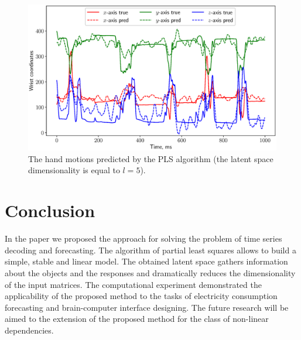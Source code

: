 \documentclass[runningheads]{llncs}
\begin{document}
\begin{figure}[!h]
	\centering
	\includegraphics[width=\textwidth]{figs/ecog_prediction}
	\caption{The hand motions predicted by the PLS algorithm (the latent space dimensionality is equal to $l=5$).}
	\label{fig::ecog_prediction}
\end{figure}

\section{Conclusion}
In the paper we proposed the approach for solving the problem of time series decoding and forecasting. 
The algorithm of partial least squares allows to build a simple, stable and linear model. 
The obtained latent space gathers information about the objects and the responses and dramatically reduces the dimensionality of the input matrices. 
The computational experiment demonstrated the applicability of the proposed method to the tasks of electricity consumption forecasting and brain-computer interface designing.
The future research will be aimed to the extension of the proposed method for the class of non-linear dependencies.

% 
% 
\end{document}
